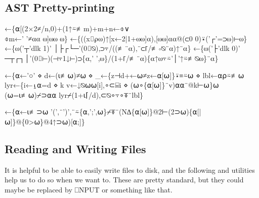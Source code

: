 \documentclass{article}%
\begin{document}
\subsection{AST Pretty-printing}

\nwenddocs{}\endmoddef\nwstartdeflinemarkup{}\nwenddeflinemarkup
{}←\{⍺[(2×2≠/n,0)+(1↑⍨≢m)+m+n←⌽∨\\⌽m←' '≠⍺⍺ ⍵]⍵⍵ ⍵\}
←\{((x⌷⍴⍵)↑[x←2|1+⍵⍵]⍺),[⍵⍵]⍺⍺@(⊂0 0)⍣('┌'=⊃⍵)⊢⍵\}
←\{⍵('┬'dlk 1)' │├┌└─'(0⌷⍉),⊃⍪/((≢¨⍺),¨⊂⌈/≢∘⍉¨⍺)↑¨⍺\}
←\{⍵('├'dlk 0)' ─┬┌┐│'(0⌷⊢)(⊣⍪1↓⊢)⊃\{⍺,' ',⍵\}/(1+⌈/≢¨⍺)\{⍺↑⍵⍪⍨'│'↑⍨≢⍉⍵\}¨⍺\}

←\{⍺←'○' ⋄ d←(⍳≢⍵)≠⍵ ⋄ _←\{z⊣d+←⍵≠z←⍺[⍵]\}⍣≡⍨⍵ ⋄ lbl←⍺⍴⍨≢⍵
  lyr←\{i←⍸⍺=d ⋄ k v←↓⍉⍵⍵[i],∘⊂⌸i ⋄ (⍵∘\{⍺[⍵]\}¨v)⍺⍺¨@k⊢⍵\}⍵
  (⍵=⍳≢⍵)⌿⊃⍺⍺ lyr⌿(1+⍳⌈/d),⊂⍉∘⍪∘⍕¨lbl\}

←\{⍺←⍳≢⊃⍵
  '(',¨')',¨⍨\{⍺,';',⍵\}⌿⍕¨(N∆\{⍺[⍵]\}@2⊢(2⊃⍵)\{⍺[|⍵]\}@\{0>⍵\}@4↑⊃⍵)[⍺;]\}
\eatline
{}\nwendcode{}\nwdocspar
\subsection{Reading and Writing Files}

It is helpful to be able to easily write files to disk, and the 
following {\Tt{}\nwendquote} and {\Tt{}\nwendquote} utilities help us to do so when we 
want to.
These are pretty standard, but they could maybe be replaced by 
{\Tt{}⎕NPUT\nwendquote} or something like that.
\end{document}
